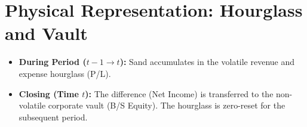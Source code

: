 \section{Physical Representation: Hourglass and Vault}
\begin{itemize}
    \item \textbf{During Period ($t-1 \to t$):} Sand accumulates in the volatile revenue and expense hourglass (P/L).
    \item \textbf{Closing (Time $t$):} The difference (Net Income) is transferred to the non-volatile corporate vault (B/S Equity). The hourglass is zero-reset for the subsequent period.
\end{itemize}
\fi
